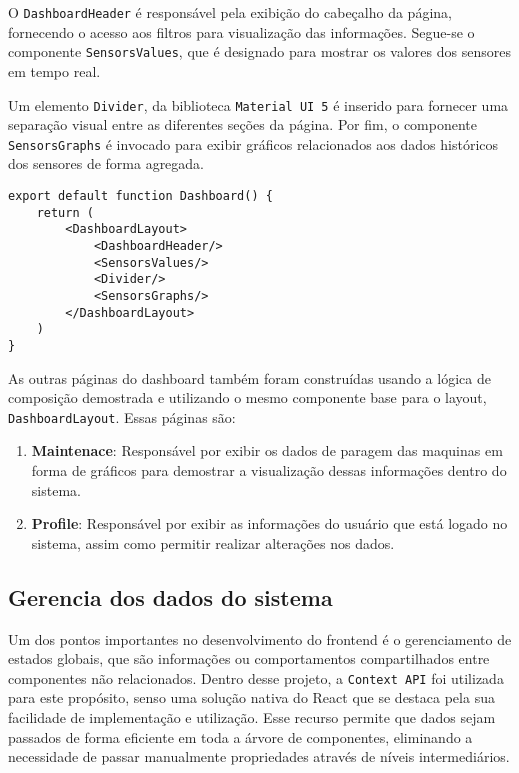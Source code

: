 O \texttt{DashboardHeader} é responsável pela exibição do cabeçalho da página, fornecendo o acesso aos filtros para visualização das informações. Segue-se o componente \texttt{SensorsValues}, que é designado para mostrar os valores dos sensores em tempo real.

Um elemento \texttt{Divider}, da biblioteca \texttt{Material UI 5} \cite{muiDocs} é inserido para fornecer uma separação visual entre as diferentes seções da página. Por fim, o componente \texttt{SensorsGraphs} é invocado para exibir gráficos relacionados aos dados históricos dos sensores de forma agregada.

\begin{verbatim}
export default function Dashboard() {
    return (
        <DashboardLayout>
            <DashboardHeader/>
            <SensorsValues/>
            <Divider/>
            <SensorsGraphs/>
        </DashboardLayout>
    )
}
\end{verbatim}

As outras páginas do dashboard também foram construídas usando a lógica de composição demostrada e utilizando o mesmo componente base para o layout, \texttt{DashboardLayout}. Essas páginas são:
\begin{enumerate}
    \item \textbf{Maintenace}: Responsável por exibir os dados de paragem das maquinas em forma de gráficos para demostrar a visualização dessas informações dentro do sistema. %
    \item \textbf{Profile}: Responsável por exibir as informações do usuário que está logado no sistema, assim como permitir realizar alterações nos dados. %
\end{enumerate}


\subsection{Gerencia dos dados do sistema}\label{subsec:contextApi}
Um dos pontos importantes no desenvolvimento do frontend é o gerenciamento de estados globais, que são informações ou comportamentos compartilhados entre componentes não relacionados. Dentro desse projeto, a \texttt{Context API} \cite{reactCreateContext} foi utilizada para este propósito, senso uma solução nativa do React que se destaca pela sua facilidade de implementação e utilização. Esse recurso permite que dados sejam passados de forma eficiente em toda a árvore de componentes, eliminando a necessidade de passar manualmente propriedades através de níveis intermediários.

